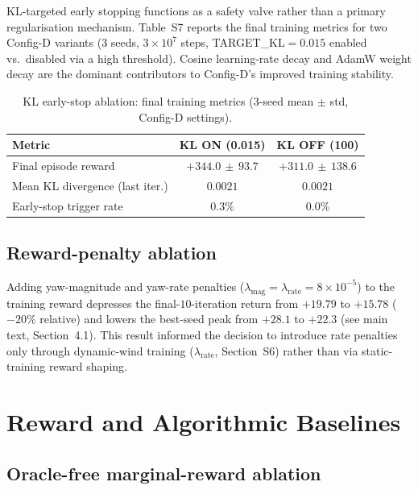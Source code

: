 \documentclass{article}
\begin{document}
KL-targeted early stopping functions as a safety valve rather than a primary regularisation mechanism. Table~S7 reports the final training metrics for two Config-D variants (3 seeds, $3{\times}10^{7}$ steps, TARGET\_KL${=}0.015$ enabled vs.\ disabled via a high threshold). Cosine learning-rate decay and AdamW weight decay are the dominant contributors to Config-D's improved training stability.

\begin{table}[h]
\centering
\caption{KL early-stop ablation: final training metrics (3-seed mean $\pm$ std, Config-D settings).}
\label{tab:kl}
\small
\begin{tabular}{lcc}
\toprule
Metric & KL ON (0.015) & KL OFF (100) \\
\midrule
Final episode reward & $+344.0\,\pm\,93.7$ & $+311.0\,\pm\,138.6$ \\
Mean KL divergence (last iter.) & $0.0021$ & $0.0021$ \\
Early-stop trigger rate & $0.3\%$ & $0.0\%$ \\
\bottomrule
\end{tabular}
\end{table}

\subsection{Reward-penalty ablation}

Adding yaw-magnitude and yaw-rate penalties ($\lambda_\mathrm{mag}{=}\lambda_\mathrm{rate}{=}8{\times}10^{-5}$) to the training reward depresses the final-$10$-iteration return from $+19.79$ to $+15.78$ ($-20\%$ relative) and lowers the best-seed peak from $+28.1$ to $+22.3$ (see main text, Section~4.1). This result informed the decision to introduce rate penalties only through dynamic-wind training ($\lambda_\mathrm{rate}$, Section~S6) rather than via static-training reward shaping.

\section{Reward and Algorithmic Baselines}\label{sec:baselines}

\subsection{Oracle-free marginal-reward ablation}
\end{document}
